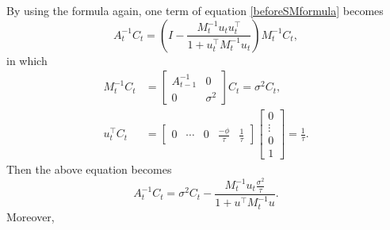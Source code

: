 By using the formula again, one term of equation \eqref{beforeSMformula} becomes 
\begin{equation}
A_{t}^{-1}C_{t} = \left( I - \frac{M_{t}^{-1}u_{t}u_{t}^\top }{1+u_{t}^\top M_{t}^{-1} u_{t}} \right)M_{t}^{-1}C_{t},
\end{equation}
in which
\begin{align*}
M_{t}^{-1}C_{t}    &=\left[ \begin{array}{cc} A_{t-1}^{-1} & 0 \\ 0 & \sigma^2 \end{array} \right]C_{t}=\sigma^2 C_{t},\\
u_{t}^\top C_{t} & = \left[ \begin{array}{ccccc} 0 & \cdots & 0 &\frac{-\phi}{\tau} & \frac{1}{\tau} \end{array} \right] \left[ \begin{array}{c} 0 \\ \vdots \\ 0\\ 1 \end{array} \right]= \frac{1}{\tau}.
\end{align*}
Then the above equation becomes
\begin{equation}
A_{t}^{-1}C_{t} = \sigma^2 C_{t}-\frac{M_{t}^{-1} u_{t} \frac{\sigma^2}{\tau}}{1+u^\top M_{t}^{-1} u}.
\end{equation}
Moreover,
